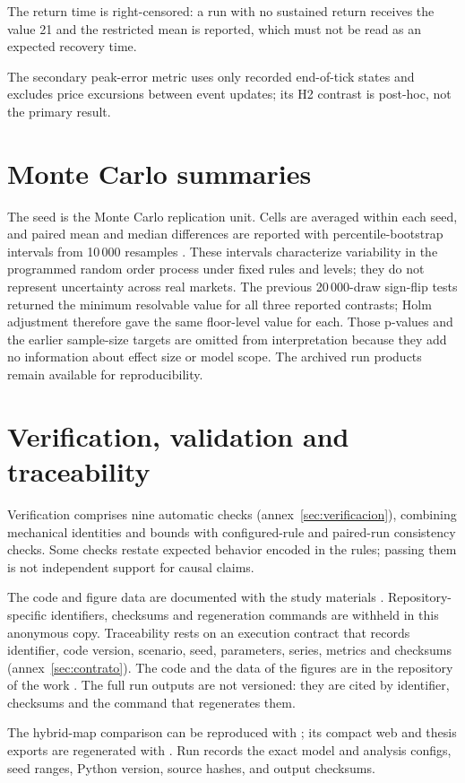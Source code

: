 The return time is right-censored: a run with no sustained return receives the value 21 and the restricted mean is reported, which must not be read as an expected recovery time.

The secondary peak-error metric uses only recorded end-of-tick states and excludes price excursions between event updates; its H2 contrast is post-hoc, not the primary result.

\section{Monte Carlo summaries}
\label{sec:analisis-estadistico}

The seed is the Monte Carlo replication unit. Cells are averaged within each seed, and paired mean and median differences are reported with percentile-bootstrap intervals from 10\,000 resamples \cite{efron1979bootstrap}. These intervals characterize variability in the programmed random order process under fixed rules and levels; they do not represent uncertainty across real markets. The previous 20\,000-draw sign-flip tests returned the minimum resolvable value for all three reported contrasts; Holm adjustment therefore gave the same floor-level value for each. Those p-values and the earlier sample-size targets are omitted from interpretation because they add no information about effect size or model scope. The archived run products remain available for reproducibility.

\section{Verification, validation and traceability}

Verification comprises nine automatic checks (annex~\ref{sec:verificacion}), combining mechanical identities and bounds with configured-rule and paired-run consistency checks. Some checks restate expected behavior encoded in the rules; passing them is not independent support for causal claims.

\ifdefined\blindreviewmode
The code and figure data are documented with the study materials \cite{calderon2026repository}. Repository-specific identifiers, checksums and regeneration commands are withheld in this anonymous copy.
\else
Traceability rests on an execution contract that records identifier, code version, scenario, seed, parameters, series, metrics and checksums (annex~\ref{sec:contrato}). The code and the data of the figures are in the repository of the work \cite{calderon2026repository}. The full run outputs are not versioned: they are cited by identifier, checksums and the command that regenerates them.

The hybrid-map comparison can be reproduced with ; its compact web and thesis exports are regenerated with . Run \code{\HybridRunID} records the exact model and analysis configs, seed ranges, Python version, source hashes, and output checksums.
\fi
